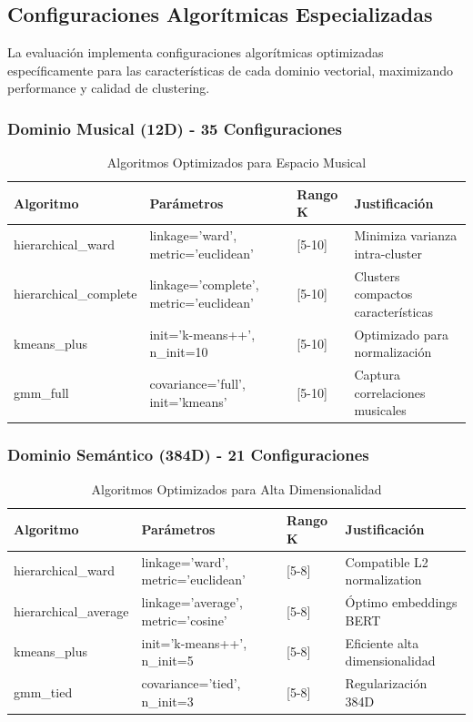 \documentclass[12pt,a4paper]{article}
\begin{document}
\subsection{Configuraciones Algorítmicas Especializadas}

La evaluación implementa configuraciones algorítmicas optimizadas específicamente para las características de cada dominio vectorial, maximizando performance y calidad de clustering.

\subsubsection{Dominio Musical (12D) - 35 Configuraciones}

\begin{table}[H]
\centering
\caption{Algoritmos Optimizados para Espacio Musical}
\begin{tabular}{|l|l|l|l|}
\hline
\textbf{Algoritmo} & \textbf{Parámetros} & \textbf{Rango K} & \textbf{Justificación} \\
\hline
hierarchical\_ward & linkage='ward', metric='euclidean' & [5-10] & Minimiza varianza intra-cluster \\
\hline
hierarchical\_complete & linkage='complete', metric='euclidean' & [5-10] & Clusters compactos características \\
\hline
kmeans\_plus & init='k-means++', n\_init=10 & [5-10] & Optimizado para normalización \\
\hline
gmm\_full & covariance='full', init='kmeans' & [5-10] & Captura correlaciones musicales \\
\hline
\end{tabular}
\end{table}

\subsubsection{Dominio Semántico (384D) - 21 Configuraciones}

\begin{table}[H]
\centering
\caption{Algoritmos Optimizados para Alta Dimensionalidad}
\begin{tabular}{|l|l|l|l|}
\hline
\textbf{Algoritmo} & \textbf{Parámetros} & \textbf{Rango K} & \textbf{Justificación} \\
\hline
hierarchical\_ward & linkage='ward', metric='euclidean' & [5-8] & Compatible L2 normalization \\
\hline
hierarchical\_average & linkage='average', metric='cosine' & [5-8] & Óptimo embeddings BERT \\
\hline
kmeans\_plus & init='k-means++', n\_init=5 & [5-8] & Eficiente alta dimensionalidad \\
\hline
gmm\_tied & covariance='tied', n\_init=3 & [5-8] & Regularización 384D \\
\hline
\end{tabular}
\end{table}
\end{document}

